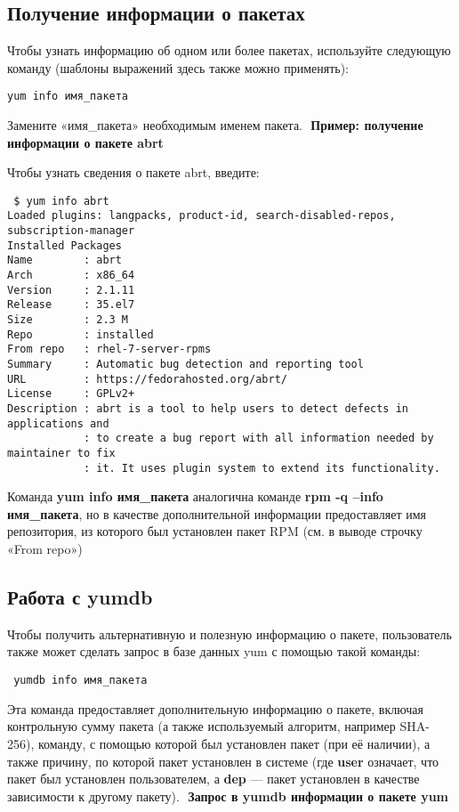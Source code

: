 \documentclass[a4paper,10pt,twoside]{article}
\begin{document}
\subsection{Получение информации о пакетах}
Чтобы узнать информацию об одном или более пакетах,  используйте следующую команду (шаблоны выражений здесь также можно применять):
\begin{verbatim}
yum info имя_пакета\end{verbatim} 
Замените «имя\_пакета» необходимым именем пакета.
⁠
\textbf{Пример: получение информации о пакете abrt}

Чтобы узнать сведения о пакете abrt, введите:

\begin{verbatim}
 $ yum info abrt
Loaded plugins: langpacks, product-id, search-disabled-repos, subscription-manager
Installed Packages
Name        : abrt
Arch        : x86_64
Version     : 2.1.11
Release     : 35.el7
Size        : 2.3 M
Repo        : installed
From repo   : rhel-7-server-rpms
Summary     : Automatic bug detection and reporting tool
URL         : https://fedorahosted.org/abrt/
License     : GPLv2+
Description : abrt is a tool to help users to detect defects in applications and
            : to create a bug report with all information needed by maintainer to fix
            : it. It uses plugin system to extend its functionality.
\end{verbatim}

Команда \textbf{yum info имя\_пакета} аналогична команде \textbf{rpm -q --info имя\_пакета}, но в качестве дополнительной информации предоставляет имя репозитория, из которого был установлен пакет RPM (см. в выводе строчку «From repo»)

\subsection{Работа с yumdb}
Чтобы получить альтернативную и полезную информацию о пакете, пользователь также может сделать запрос в базе данных yum с помощью такой команды:

\begin{verbatim}
 yumdb info имя_пакета
\end{verbatim} 

Эта команда предоставляет дополнительную информацию о пакете, включая контрольную сумму пакета (а также используемый алгоритм, например SHA-256), команду, с помощью которой был установлен пакет (при её наличии), а также причину, по которой пакет установлен в системе (где \textbf{user} означает, что пакет был установлен пользователем, а \textbf{dep} — пакет установлен в качестве зависимости к другому пакету).
⁠
\textbf{Запрос в yumdb информации о пакете yum}
\end{document}
